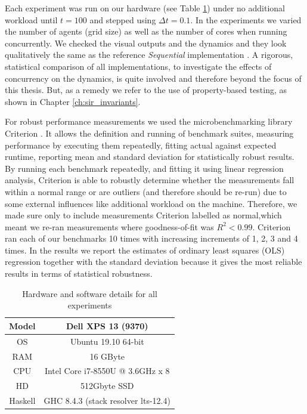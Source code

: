Each experiment was run on our hardware (see Table \ref{tab:machine_specs}) under no additional workload until $t = 100$ and stepped using $\Delta t = 0.1$. In the experiments we varied the number of agents (grid size) as well as the number of cores when running concurrently. We checked the visual outputs and the dynamics and they look qualitatively the same as the reference \textit{Sequential} implementation \cite{thaler_pure_2018}. A rigorous, statistical comparison of all implementations, to investigate the effects of concurrency on the dynamics, is quite involved and therefore beyond the focus of this thesis. But, as a remedy we refer to the use of property-based testing, as shown in Chapter \ref{ch:sir_invariants}.

For robust performance measurements we used the microbenchmarking library Criterion \cite{criterion_serpentine, criterion_hackage}. It allows the definition and running of benchmark suites, measuring performance by executing them repeatedly, fitting actual against expected runtime, reporting mean and standard deviation for statistically robust results. By running each benchmark repeatedly, and fitting it using linear regression analysis, Criterion is able to robustly determine whether the measurements fall within a normal range or are outliers (and therefore should be re-run) due to some external influences like additional workload on the machine. Therefore, we made sure only to include measurements Criterion labelled as normal,which meant we re-ran measurements where goodness-of-fit was $R^2 < 0.99$. Criterion ran each of our benchmarks 10 times with increasing increments of 1, 2, 3 and 4 times. In the results we report the estimates of ordinary least squares (OLS) regression together with the standard deviation because it gives the most reliable results in terms of statistical robustness. 

\begin{table}
	\centering
	\begin{tabular}{ c || c }
		Model   & Dell XPS 13 (9370)				    \\ \hline
		OS      & Ubuntu 19.10 64-bit 				\\ \hline
		RAM     & 16 GByte 							\\ \hline
		CPU     & Intel Core i7-8550U @ 3.6GHz x 8 	\\ \hline
		HD      & 512Gbyte SSD 						\\ \hline
		Haskell & GHC 8.4.3 (stack resolver lts-12.4)
	\end{tabular}
	
	\caption{Hardware and software details for all experiments}
	\label{tab:machine_specs}
\end{table}

